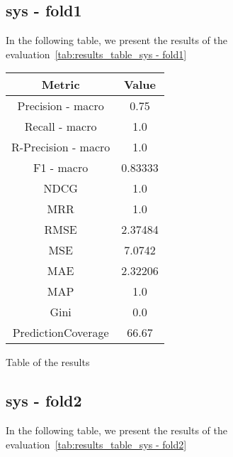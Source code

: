\documentclass[11pt]{article}
\begin{document}



\subsection{sys - fold1}\label{subsec:sys - fold1}
In the following table, we present the results of the evaluation~\ref{tab:results_table_sys - fold1}

\begin{center}
    \begin{tabular}{|c|c|}
        \hline
        \textbf{Metric} & \textbf{Value} \\ \hline
        Precision - macro & 0.75\\ \hline
                Recall - macro & 1.0\\ \hline
                R-Precision - macro & 1.0\\ \hline
                F1 - macro &  0.83333\\ \hline
                NDCG  & 1.0\\ \hline
            MRR  & 1.0\\ \hline
            RMSE & 2.37484\\ \hline
            MSE & 7.0742\\ \hline
            MAE & 2.32206\\ \hline
            MAP  & 1.0\\ \hline
            Gini & 0.0\\ \hline
            PredictionCoverage & 66.67\\ \hline
         \end{tabular}
    \captionsetup{type=table}
    \caption{Table of the results}
    \label{tab:results_table_sys - fold1}
\end{center}
\hfill\break
\hfill\break



\subsection{sys - fold2}\label{subsec:sys - fold2}
In the following table, we present the results of the evaluation~\ref{tab:results_table_sys - fold2}
\end{document}
